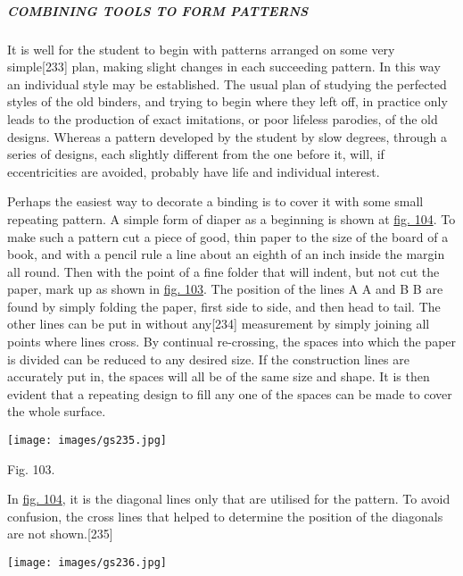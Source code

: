 \documentclass[
]{article}
\begin{document}
\hypertarget{combining-tools-to-form-patterns}{%
\subparagraph{COMBINING TOOLS TO FORM
PATTERNS}\label{combining-tools-to-form-patterns}}

It is well for the student to begin with patterns arranged on some very
simple{\protect\hypertarget{Page_233}{}{{[}233{]}}} plan, making slight
changes in each succeeding pattern. In this way an individual style may
be established. The usual plan of studying the perfected styles of the
old binders, and trying to begin where they left off, in practice only
leads to the production of exact imitations, or poor lifeless parodies,
of the old designs. Whereas a pattern developed by the student by slow
degrees, through a series of designs, each slightly different from the
one before it, will, if eccentricities are avoided, probably have life
and individual interest.

Perhaps the easiest way to decorate a binding is to cover it with some
small repeating pattern. A simple form of diaper as a beginning is shown
at \protect\hyperlink{Fig_104}{fig. 104}. To make such a pattern cut a
piece of good, thin paper to the size of the board of a book, and with a
pencil rule a line about an eighth of an inch inside the margin all
round. Then with the point of a fine folder that will indent, but not
cut the paper, mark up as shown in \protect\hyperlink{Fig_103}{fig.
103}. The position of the lines A A and B B are found by simply folding
the paper, first side to side, and then head to tail. The other lines
can be put in without any{\protect\hypertarget{Page_234}{}{{[}234{]}}}
measurement by simply joining all points where lines cross. By continual
re-crossing, the spaces into which the paper is divided can be reduced
to any desired size. If the construction lines are accurately put in,
the spaces will all be of the same size and shape. It is then evident
that a repeating design to fill any one of the spaces can be made to
cover the whole surface.

\protect\hypertarget{Fig_103}{}{}
\texttt{[image: images/gs235.jpg]}

Fig. 103.

In \protect\hyperlink{Fig_104}{fig. 104}, it is the diagonal lines only
that are utilised for the pattern. To avoid confusion, the cross lines
that helped to determine the position of the diagonals are not
shown.{\protect\hypertarget{Page_235}{}{{[}235{]}}}

\protect\hypertarget{Fig_104}{}{}
\texttt{[image: images/gs236.jpg]}
\end{document}
